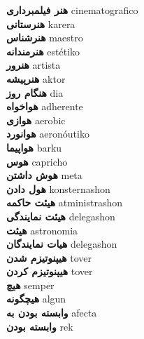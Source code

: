 \textbf{ هنر فیلمبرداری  } cinematografico \\
\textbf{ هنرستانی  } karera \\
\textbf{ هنرشناس  } maestro \\
\textbf{ هنرمندانه  } estétiko \\
\textbf{ هنرور  } artista \\
\textbf{ هنرپیشه  } aktor \\
\textbf{ هنگام روز  } dia \\
\textbf{ هواخواه  } adherente \\
\textbf{ هوازی  } aerobic \\
\textbf{ هوانورد  } aeronóutiko \\
\textbf{ هواپیما  } barku \\
\textbf{ هوس  } capricho \\
\textbf{ هوش داشتن  } meta \\
\textbf{ هول دادن  } konsternashon \\
\textbf{ هیئت حاکمه  } atministrashon \\
\textbf{ هیئت نمایندگی  } delegashon \\
\textbf{ هیئت  } astronomia \\
\textbf{ هیات نمایندگان  } delegashon \\
\textbf{ هیپنوتیزم شدن  } tover \\
\textbf{ هیپنوتیزم کردن  } tover \\
\textbf{ هیچ  } semper \\
\textbf{ هیچگونه  } algun \\
\textbf{ وابسته بودن به  } afecta \\
\textbf{ وابسته بودن  } rek \\
